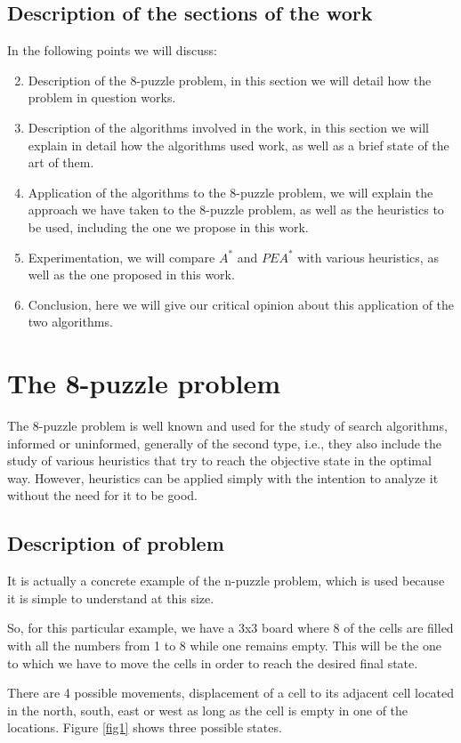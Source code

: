 \documentclass[runningheads]{llncs}
\begin{document}
\subsection{Description of the sections of the work}
In the following points we will discuss:
\begin{enumerate}
\setcounter{enumi}{1}
\item Description of the 8-puzzle problem, in this section we will detail how the problem in question works.
\item Description of the algorithms involved in the work, in this section we will explain in detail how the algorithms used work, as well as a brief state of the art of them.
\item Application of the algorithms to the 8-puzzle problem, we will explain the approach we have taken to the 8-puzzle problem, as well as the heuristics to be used, including the one we propose in this work.
\item Experimentation, we will compare $A^*$ and $PEA^*$ with various heuristics, as well as the one proposed in this work.
\item Conclusion, here we will give our critical opinion about this application of the two algorithms.
\end{enumerate}

\section{The 8-puzzle problem}
The 8-puzzle problem is well known and used for the study of search algorithms, informed or uninformed, 
generally of the second type, i.e., they also include the study of various heuristics that try to reach 
the objective state in the optimal way. However, heuristics can be applied simply with the intention to 
analyze it without the need for it to be good.

\subsection{Description of problem}
It is actually a concrete example of the n-puzzle problem, which is used because it is simple to understand 
at this size.

So, for this particular example, we have a 3x3 board where 8 of the cells are filled with all the numbers 
from 1 to 8 while one remains empty. This will be the one to which we have to move the cells in order to reach 
the desired final state.

There are 4 possible movements, displacement of a cell to its adjacent cell located in the north, south, east 
or west as long as the cell is empty in one of the locations. Figure \ref{fig1} shows three possible states.
\end{document}

